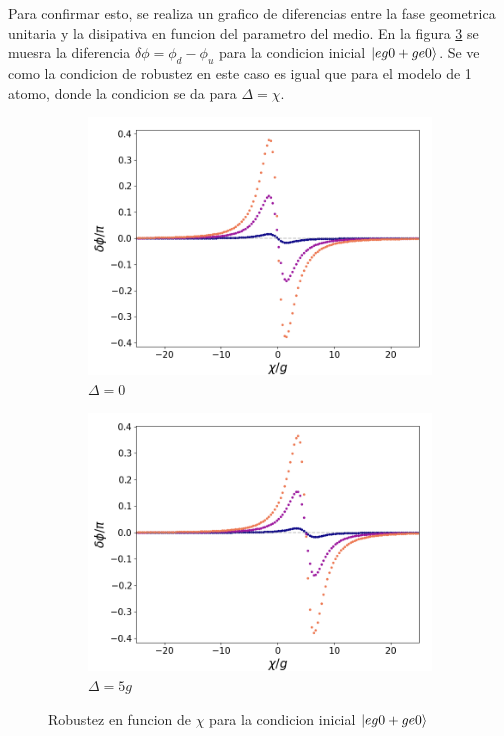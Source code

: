 Para confirmar esto, se realiza un grafico de diferencias entre la fase geometrica unitaria y la disipativa en funcion del parametro del medio. En la figura \ref{fig5:robustez kerr eg0} se muesra la diferencia $\delta\phi=\phi_d-\phi_u$ para la condicion inicial $\ket{eg0+ge0}$. Se ve como la condicion de robustez en este caso es igual que para el modelo de 1 atomo, donde la condicion se da para $\Delta=\chi$. 

\begin{figure}[h]
    \centering
    \begin{subfigure}{0.49\textwidth}
        \includegraphics[width=\textwidth]{figuras/ch5/robustez/chi/eg0+ge0 d=0.0g k=0.0g J=0.0g.png}
        \caption{$\Delta=0$}
        \label{fig5:robustez kerr 1 eg0}
    \end{subfigure}
    \hfill
    \begin{subfigure}{0.49\textwidth}
        \includegraphics[width=\textwidth]{figuras/ch5/robustez/chi/eg0+ge0 d=5.0g k=0.0g J=0.0g.png}
        \caption{$\Delta=5g$}
        \label{fig5:robustez kerr 2 eg0}
    \end{subfigure}
    \caption{Robustez en funcion de $\chi$ para la condicion inicial $\ket{eg0+ge0}$}
    \label{fig5:robustez kerr eg0}
\end{figure}

